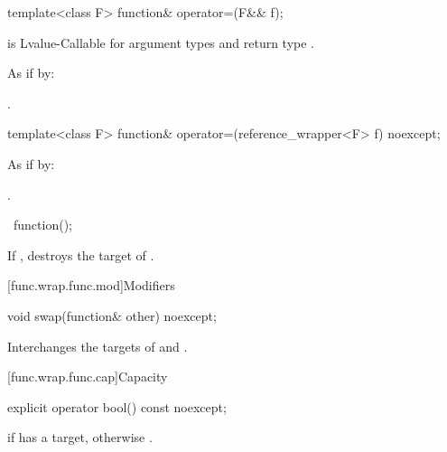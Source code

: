 %
\begin{itemdecl}
template<class F> function& operator=(F&& f);
\end{itemdecl}

\begin{itemdescr}
\pnum
\constraints
{} is Lvalue-Callable
for argument types  and return type .

\pnum
\effects
As if by: 

\pnum
\returns
{}.
\end{itemdescr}

%
\begin{itemdecl}
template<class F> function& operator=(reference_wrapper<F> f) noexcept;
\end{itemdecl}

\begin{itemdescr}
\pnum
\effects
As if by: 

\pnum
\returns
{}.
\end{itemdescr}

%
\begin{itemdecl}
~function();
\end{itemdecl}

\begin{itemdescr}
\pnum
\effects
If , destroys the target of .
\end{itemdescr}

[func.wrap.func.mod]{Modifiers}

%
\begin{itemdecl}
void swap(function& other) noexcept;
\end{itemdecl}

\begin{itemdescr}
\pnum
\effects
Interchanges the targets of  and .
\end{itemdescr}

[func.wrap.func.cap]{Capacity}

%
\begin{itemdecl}
explicit operator bool() const noexcept;
\end{itemdecl}

\begin{itemdescr}
\pnum
\returns
{} if  has a target, otherwise .
\end{itemdescr}

